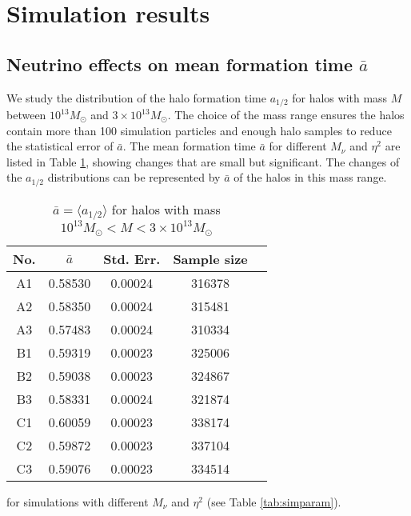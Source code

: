 \section{Simulation results}
\label{sec:result}
\subsection{Neutrino effects on mean formation time $\bar a$}
We study the distribution of the halo formation time $a_{1/2}$ for halos with mass $M$ between $10^{13} M_\odot$ and $3\times 10^{13} M_\odot$. 
The choice of the mass range ensures the halos contain more than 100 simulation particles and enough halo samples to reduce the statistical error of $\bar a$.
The mean formation time $\bar a$ for different $M_\nu$ and $\eta^2$ are listed in Table \ref{tab:formtime}, showing changes that are small but significant. The changes of the $a_{1/2}$ distributions can be represented by $\bar a$ of the halos in this mass range.

\begin{table}[!h]
		\begin{center}
		\begin{tabular}{|c|c|c|c|c|}
			\hline
			No. & $\bar a$ & Std. Err. & Sample size \\
			\hline \hline
			A1 & 0.58530 & 0.00024 & 316378  \\
			A2 & 0.58350 & 0.00024 & 315481  \\
			A3 & 0.57483 & 0.00024 & 310334  \\
			\hline
			B1 & 0.59319 & 0.00023 & 325006  \\
			B2 & 0.59038 & 0.00023 & 324867  \\
			B3 & 0.58331 & 0.00024  & 321874  \\
			\hline
			C1 & 0.60059 & 0.00023 & 338174  \\
			C2 & 0.59872 & 0.00023 & 337104  \\
			C3 & 0.59076 & 0.00023  & 334514  \\		
			\hline
		\end{tabular}
		\caption{\label{tab:formtime} $\bar a = \langle a_{1/2} \rangle$ for halos with mass $10^{13}M_\odot < M <3\times10^{13} M_\odot$} for simulations with different $M_\nu$ and $\eta^2$  (see Table \ref{tab:simparam}).
		\end{center}
\end{table}


